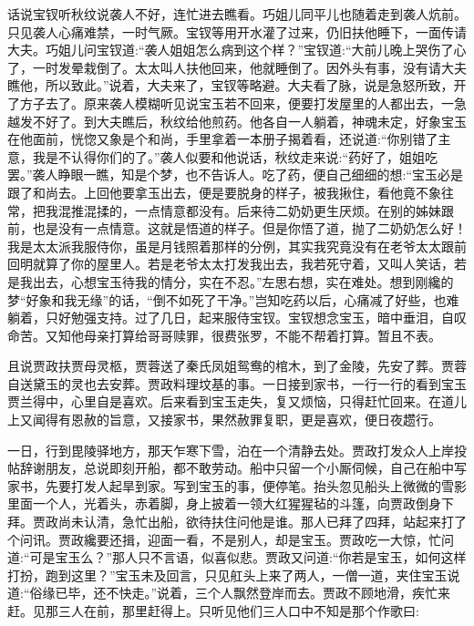


\begin{parag}
    话说宝钗听秋纹说袭人不好，连忙进去瞧看。巧姐儿同平儿也随着走到袭人炕前。只见袭人心痛难禁，一时气厥。宝钗等用开水灌了过来，仍旧扶他睡下，一面传请大夫。巧姐儿问宝钗道:“袭人姐姐怎么病到这个样？”宝钗道:“大前儿晚上哭伤了心了，一时发晕栽倒了。太太叫人扶他回来，他就睡倒了。因外头有事，没有请大夫瞧他，所以致此。”说着，大夫来了，宝钗等略避。大夫看了脉，说是急怒所致，开了方子去了。原来袭人模糊听见说宝玉若不回来，便要打发屋里的人都出去，一急越发不好了。到大夫瞧后，秋纹给他煎药。他各自一人躺着，神魂未定，好象宝玉在他面前，恍惚又象是个和尚，手里拿着一本册子揭着看，还说道:“你别错了主意，我是不认得你们的了。”袭人似要和他说话，秋纹走来说:“药好了，姐姐吃罢。”袭人睁眼一瞧，知是个梦，也不告诉人。吃了药，便自己细细的想:“宝玉必是跟了和尚去。上回他要拿玉出去，便是要脱身的样子，被我揪住，看他竟不象往常，把我混推混揉的，一点情意都没有。后来待二奶奶更生厌烦。在别的姊妹跟前，也是没有一点情意。这就是悟道的样子。但是你悟了道，抛了二奶奶怎么好！我是太太派我服侍你，虽是月钱照着那样的分例，其实我究竟没有在老爷太太跟前回明就算了你的屋里人。若是老爷太太打发我出去，我若死守着，又叫人笑话，若是我出去，心想宝玉待我的情分，实在不忍。”左思右想，实在难处。想到刚纔的梦“好象和我无缘”的话，“倒不如死了干净。”岂知吃药以后，心痛减了好些，也难躺着，只好勉强支持。过了几日，起来服侍宝钗。宝钗想念宝玉，暗中垂泪，自叹命苦。又知他母亲打算给哥哥赎罪，很费张罗，不能不帮着打算。暂且不表。
\end{parag}


\begin{parag}
    且说贾政扶贾母灵柩，贾蓉送了秦氏凤姐鸳鸯的棺木，到了金陵，先安了葬。贾蓉自送黛玉的灵也去安葬。贾政料理坟基的事。一日接到家书，一行一行的看到宝玉贾兰得中，心里自是喜欢。后来看到宝玉走失，复又烦恼，只得赶忙回来。在道儿上又闻得有恩赦的旨意，又接家书，果然赦罪复职，更是喜欢，便日夜趱行。
\end{parag}


\begin{parag}
    一日，行到毘陵驿地方，那天乍寒下雪，泊在一个清静去处。贾政打发众人上岸投帖辞谢朋友，总说即刻开船，都不敢劳动。船中只留一个小厮伺候，自己在船中写家书，先要打发人起旱到家。写到宝玉的事，便停笔。抬头忽见船头上微微的雪影里面一个人，光着头，赤着脚，身上披着一领大红猩猩毡的斗篷，向贾政倒身下拜。贾政尚未认清，急忙出船，欲待扶住问他是谁。那人已拜了四拜，站起来打了个问讯。贾政纔要还揖，迎面一看，不是别人，却是宝玉。贾政吃一大惊，忙问道:“可是宝玉么？”那人只不言语，似喜似悲。贾政又问道:“你若是宝玉，如何这样打扮，跑到这里？”宝玉未及回言，只见舡头上来了两人，一僧一道，夹住宝玉说道:“俗缘已毕，还不快走。”说着，三个人飘然登岸而去。贾政不顾地滑，疾忙来赶。见那三人在前，那里赶得上。只听见他们三人口中不知是那个作歌曰:
\end{parag}


